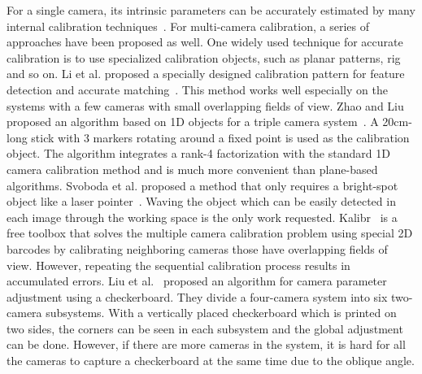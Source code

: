 For a single camera, its intrinsic parameters can be accurately estimated by many internal calibration techniques~\cite{zhang2000flexible,zhang2004camera}.
For multi-camera calibration, a series of approaches have been proposed as well.
One widely used technique for accurate calibration is to use specialized calibration objects, such as planar patterns, rig and so on.
%
Li et al. proposed a specially designed calibration pattern for feature detection and accurate matching~\cite{Li2013A}. %
This method works well especially on the systems with a few cameras with small overlapping fields of view.
%
Zhao and Liu proposed an algorithm based on 1D objects for a triple camera system~\cite{zhao2008practical}.
A 20cm-long stick with 3 markers rotating around a fixed point is used as the calibration object.
The algorithm integrates a rank-4 factorization with the standard 1D camera calibration method and is much more convenient than plane-based algorithms.
Svoboda et al. proposed a method that only requires a bright-spot object like a laser pointer~\cite{svoboda2005convenient}.
Waving the object which can be easily detected in each image through the working space is the only work requested.
%
Kalibr~\cite{Maye2013Self} is a free toolbox that solves the multiple camera calibration problem using special 2D barcodes by calibrating neighboring cameras those have overlapping fields of view.
%
However, repeating the sequential calibration process results in accumulated errors.
%
Liu et al.~\cite{Liu2015Algorithm} proposed an algorithm for camera parameter adjustment using a checkerboard. They divide a four-camera system into six two-camera subsystems. With a vertically placed checkerboard which is printed on two sides, the corners can be seen in each subsystem and the global adjustment can be done.
However, if there are more cameras in the system, it is hard for all the cameras to capture a checkerboard at the same time due to the oblique angle.


